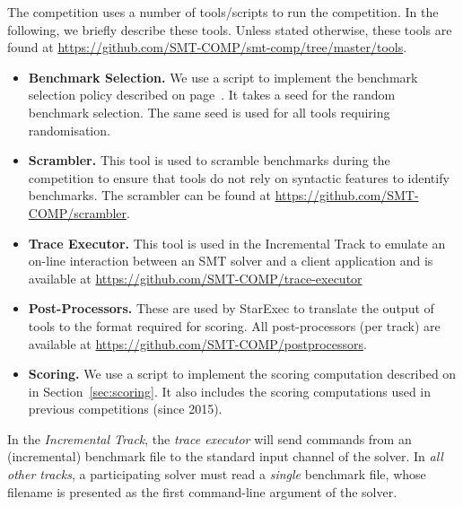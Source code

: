 \documentclass[12pt]{article}
\newcommand{\inctrack}{Incremental Track\xspace}
\begin{document}
 \label{tools}
The competition uses a number of tools/scripts to run the competition. In the
following, we briefly describe these tools. Unless stated otherwise, these
tools are found at \url{https://github.com/SMT-COMP/smt-comp/tree/master/tools}.
\begin{itemize}
  \item \textbf{Benchmark Selection.} We use a script to implement the
    benchmark selection policy described on page~\pageref{benchmark-selection}.
    It takes a seed for the random benchmark selection. The same seed is used
    for all tools requiring randomisation.
  \item \textbf{Scrambler.} This tool is used to scramble benchmarks during the
    competition to ensure that tools do not rely on syntactic features to
    identify benchmarks. The scrambler can be found at
    \url{https://github.com/SMT-COMP/scrambler}.
  \item \textbf{Trace Executor.} This tool is used in the \inctrack to emulate
    an on-line interaction between an SMT solver and a client application and
    is available at \url{https://github.com/SMT-COMP/trace-executor}
  \item \textbf{Post-Processors.} These are used by StarExec to translate the
    output of tools to the format required for scoring. All post-processors (per
    track) are available at \url{https://github.com/SMT-COMP/postprocessors}.
  \item \textbf{Scoring.} We use a script to implement the scoring computation
    described on in Section~\ref{sec:scoring}. It also includes the scoring
    computations used in previous competitions (since 2015).
\end{itemize}

%
In the \emph{\inctrack}, the \emph{trace executor} will send commands from an
(incremental) benchmark file to the standard input channel of the solver.  In
\emph{all other tracks}, a participating solver must read a \emph{single}
benchmark file, whose filename is presented as the first command-line argument
of the solver.
\end{document}
